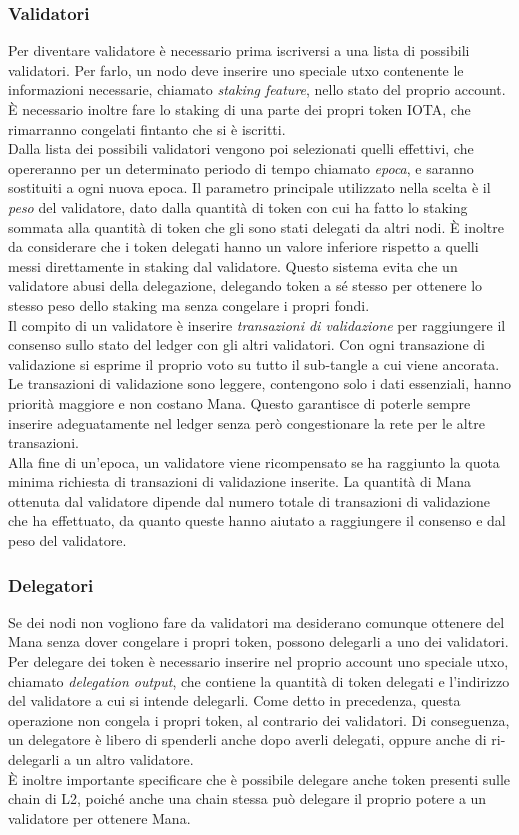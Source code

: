 \documentclass[12pt,a4paper,openright,twoside]{report}
\begin{document}
\subsubsection{Validatori}
Per diventare validatore è necessario prima iscriversi a una lista di possibili validatori. Per farlo, un nodo deve inserire uno speciale \acrshort{utxo} contenente le informazioni necessarie, chiamato \textit{staking feature}, nello stato del proprio account. È necessario inoltre fare lo staking di una parte dei propri token IOTA, che rimarranno congelati fintanto che si è iscritti.\\
Dalla lista dei possibili validatori vengono poi selezionati quelli effettivi, che opereranno per un determinato periodo di tempo chiamato \textit{epoca}, e saranno sostituiti a ogni nuova epoca. Il parametro principale utilizzato nella scelta è il \textit{peso} del validatore, dato dalla quantità di token con cui ha fatto lo staking sommata alla quantità di token che gli sono stati delegati da altri nodi. È inoltre da considerare che i token delegati hanno un valore inferiore rispetto a quelli messi direttamente in staking dal validatore. Questo sistema evita che un validatore abusi della delegazione, delegando token a sé stesso per ottenere lo stesso peso dello staking ma senza congelare i propri fondi.\\
Il compito di un validatore è inserire \textit{transazioni di validazione} per raggiungere il consenso sullo stato del ledger con gli altri validatori. Con ogni transazione di validazione si esprime il proprio voto su tutto il sub-tangle a cui viene ancorata.\\
Le transazioni di validazione sono leggere, contengono solo i dati essenziali, hanno priorità maggiore e non costano Mana. Questo garantisce di poterle sempre inserire adeguatamente nel ledger senza però congestionare la rete per le altre transazioni.\\
Alla fine di un'epoca, un validatore viene ricompensato se ha raggiunto la quota minima richiesta di transazioni di validazione inserite. La quantità di Mana ottenuta dal validatore dipende dal numero totale di transazioni di validazione che ha effettuato, da quanto queste hanno aiutato a raggiungere il consenso e dal peso del validatore.
\subsubsection{Delegatori}
Se dei nodi non vogliono fare da validatori ma desiderano comunque ottenere del Mana senza dover congelare i propri token, possono delegarli a uno dei validatori. Per delegare dei token è necessario inserire nel proprio account uno speciale \acrshort{utxo}, chiamato \textit{delegation output}, che contiene la quantità di token delegati e l'indirizzo del validatore a cui si intende delegarli. Come detto in precedenza, questa operazione non congela i propri token, al contrario dei validatori. Di conseguenza, un delegatore è libero di spenderli anche dopo averli delegati, oppure anche di ri-delegarli a un altro validatore.\\
È inoltre importante specificare che è possibile delegare anche token presenti sulle chain di L2, poiché anche una chain stessa può delegare il proprio potere a un validatore per ottenere Mana.
\end{document}

